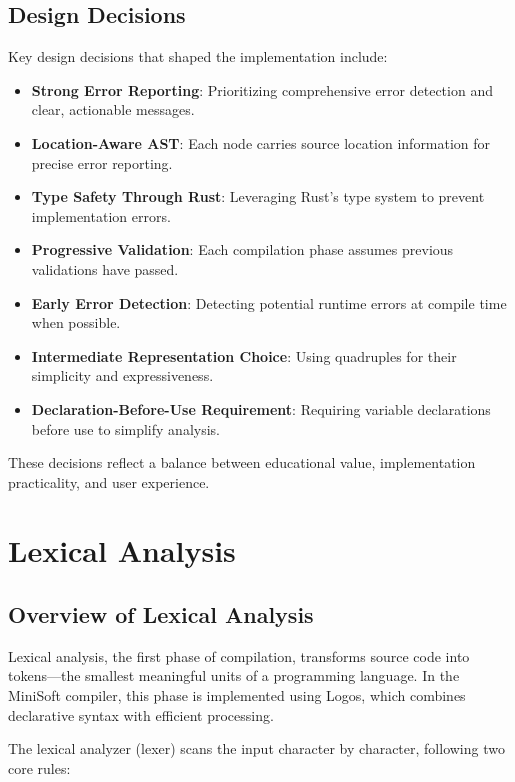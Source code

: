 \documentclass[12pt,a4paper]{article}
\begin{document}
\subsection{Design Decisions}
Key design decisions that shaped the implementation include:

\begin{itemize}
	\item \textbf{Strong Error Reporting}: Prioritizing comprehensive error detection and clear, actionable messages.

	\item \textbf{Location-Aware AST}: Each node carries source location information for precise error reporting.

	\item \textbf{Type Safety Through Rust}: Leveraging Rust's type system to prevent implementation errors.

	\item \textbf{Progressive Validation}: Each compilation phase assumes previous validations have passed.

	\item \textbf{Early Error Detection}: Detecting potential runtime errors at compile time when possible.

	\item \textbf{Intermediate Representation Choice}: Using quadruples for their simplicity and expressiveness.

	\item \textbf{Declaration-Before-Use Requirement}: Requiring variable declarations before use to simplify analysis.
\end{itemize}

These decisions reflect a balance between educational value, implementation practicality, and user experience.

\section{Lexical Analysis}
\subsection{Overview of Lexical Analysis}
Lexical analysis, the first phase of compilation, transforms source code into tokens—the smallest meaningful units of a programming language. In the MiniSoft compiler, this phase is implemented using Logos, which combines declarative syntax with efficient processing.

The lexical analyzer (lexer) scans the input character by character, following two core rules:
\end{document}

